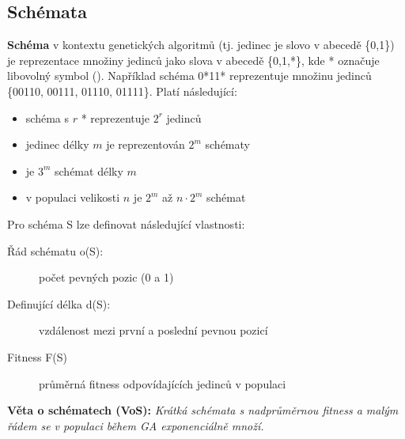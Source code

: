 \subsection{Schémata}
\textbf{Schéma} v kontextu genetických algoritmů (tj. jedinec je slovo v abecedě \{0,1\}) je reprezentace množiny jedinců jako slova v abecedě \{0,1,*\}, kde * označuje libovolný symbol (). Například schéma 0*11* reprezentuje množinu jedinců \{00110, 00111, 01110, 01111\}. Platí následující:
\begin{itemize}
	
	
	\item schéma s $r$ * reprezentuje $2^r$ jedinců
	\item jedinec délky $m$ je reprezentován $2^m$ schématy
	\item je $3^m$ schémat délky $m$
	\item v populaci velikosti $n$ je $2^m$ až $n\cdot2^m$ schémat
\end{itemize}
Pro schéma S lze definovat následující vlastnosti:
\begin{description}
	
	
	\item[Řád schématu o(S):] počet pevných pozic (0 a 1) 
	\item[Definující délka d(S):] vzdálenost mezi první a poslední pevnou pozicí
	\item[Fitness F(S)] průměrná fitness odpovídajících jedinců v populaci
\end{description}

\noindent\textbf{Věta o schématech (VoS):} \textit{Krátká schémata s nadprůměrnou fitness a malým řádem se v populaci během GA exponenciálně množí.}


